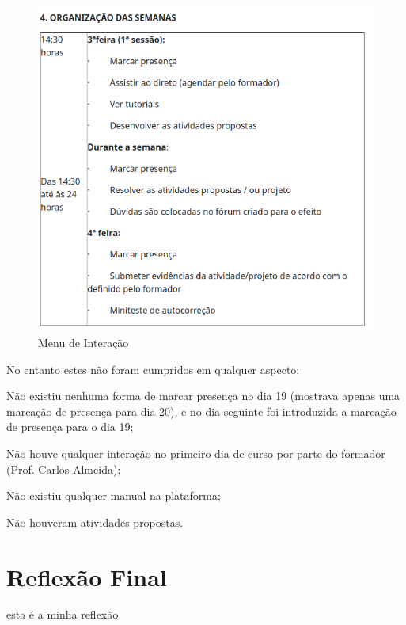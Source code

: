 \documentclass[12pt]{article}
\begin{document}
\begin{figure}[h]
        \centering
        \includegraphics[width=0.45\linewidth]{cal.png}
        \caption{Menu de Interação}
        \label{fig:menu1}
\end{figure}

No entanto estes não foram cumpridos em qualquer aspecto:


\begin{list}{•}
\item Não existiu nenhuma forma de marcar presença no dia 19 (mostrava apenas uma marcação de presença para dia 20), e no dia seguinte foi introduzida a marcação de presença para o dia 19;
\item
\item Não houve qualquer interação no primeiro dia de curso por parte do formador (Prof. Carlos Almeida);
\item Não existiu qualquer manual na plataforma;
\item Não houveram atividades propostas.

\end{list}
\section{Reflexão Final}
esta é a minha reflexão
\end{document}
